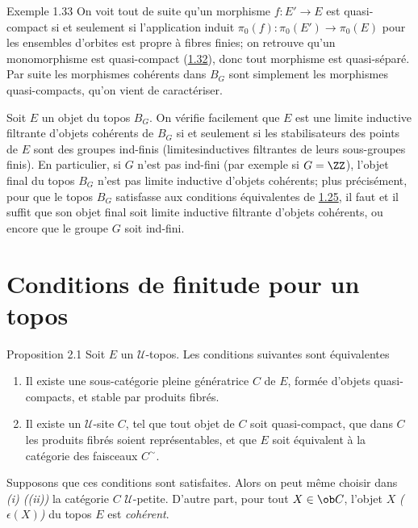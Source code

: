 \begin{enonce*}[remark]{Exemple 1.33}
On voit tout de suite qu'un morphisme $f : E'\to E$ est
quasi-compact si et seulement si l'application induit $\pi_0(f) :
\pi_0 (E')\to \pi_{0}(E)$ pour les ensembles d'orbites est propre
\ie à fibres finies; on retrouve qu'un monomorphisme est
quasi-compact (\hyperref[VI.subsec1.32]{1.32}), donc tout morphisme est
quasi-séparé. Par suite les morphismes cohérents dans $B_G$ sont
simplement les morphismes quasi-compacts, qu'on vient de
caractériser.

Soit $E$ un objet du topos $B_G$. On vérifie facilement que $E$ est
une limite inductive filtrante d'objets cohérents de $B_G$ si et
seulement si les stabilisateurs des points de $E$ sont des groupes
ind-finis (\ie limites\pageoriginale inductives filtrantes de leurs
sous-groupes finis). En particulier, si $G$ n'est pas ind-fini (par
exemple si $G =  \ZZ$), l'objet final du topos $B_G$ n'est pas
limite inductive d'objets cohérents; plus précisément, pour que le topos $B_G$
satisfasse aux conditions équivalentes de \hyperref[VI.cor1.25]{1.25}, il faut et il suffit
que son objet final soit limite inductive filtrante d'objets
cohérents, ou encore que le groupe $G$ soit ind-fini.
\end{enonce*}


\section{Conditions de finitude pour un topos}

\begin{enonce*}{Proposition 2.1}
Soit $E$ un $𝒰$-topos. Les conditions suivantes sont équivalentes
\begin{enumerate}
\renewcommand{\theenumi}{\roman{enumi}}
\renewcommand{\labelenumi}{(\theenumi)}
\item Il existe une sous-catégorie pleine génératrice $C$ de $E$,
  formée d'objets quasi-compacts, et stable par produits fibrés.

\item Il existe un $𝒰$-site $C$, tel que tout objet de $C$ soit
  quasi-compact, que dans $C$ les produits fibrés soient
  représentables, et que $E$ soit équivalent à la catégorie des
  faisceaux $C^{\sim}$.
\end{enumerate}

Supposons que ces conditions sont satisfaites. Alors on peut même
choisir dans \emph{(i) (\resp (ii))} la catégorie $C$
$𝒰$-petite. D'autre part, pour tout $X \in \ob C$, l'objet
$X$ \emph{(\resp $\epsilon (X)$)} du topos $E$ est \emph{cohérent}.
\end{enonce*}

